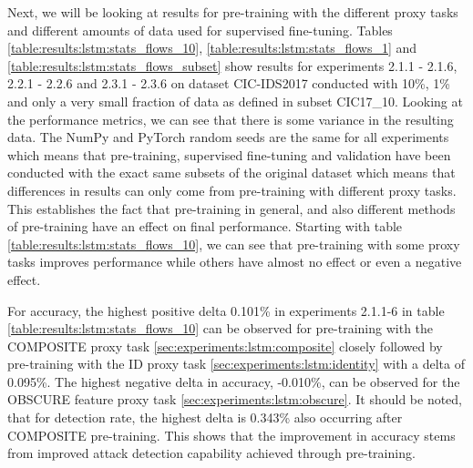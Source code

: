 Next, we will be looking at results for pre-training with the different proxy tasks and different amounts of data used for supervised fine-tuning. Tables \ref{table:results:lstm:stats_flows_10}, \ref{table:results:lstm:stats_flows_1} and \ref{table:results:lstm:stats_flows_subset} show results for experiments 2.1.1 - 2.1.6, 2.2.1 - 2.2.6 and 2.3.1 - 2.3.6 on dataset CIC-IDS2017 conducted with 10\%, 1\% and only a very small fraction of data as defined in subset CIC17\_10. Looking at the performance metrics, we can see that there is some variance in the resulting data. The NumPy and PyTorch random seeds are the same for all experiments which means that pre-training, supervised fine-tuning and validation have been conducted with the exact same subsets of the original dataset which means that differences in results can only come from pre-training with different proxy tasks. This establishes the fact that pre-training in general, and also different methods of pre-training have an effect on final performance. Starting with table \ref{table:results:lstm:stats_flows_10}, we can see that pre-training with some proxy tasks improves performance while others have almost no effect or even a negative effect. \par

For accuracy, the highest positive delta 0.101\% in experiments 2.1.1-6 in table \ref{table:results:lstm:stats_flows_10} can be observed for pre-training with the COMPOSITE proxy task \ref{sec:experiments:lstm:composite} closely followed by pre-training with the ID proxy task \ref{sec:experiments:lstm:identity} with a delta of 0.095\%. The highest negative delta in accuracy, -0.010\%, can be observed for the OBSCURE feature proxy task \ref{sec:experiments:lstm:obscure}. It should be noted, that for detection rate, the highest delta is 0.343\% also occurring after COMPOSITE pre-training. This shows that the improvement in accuracy stems from improved attack detection capability achieved through pre-training. \par





